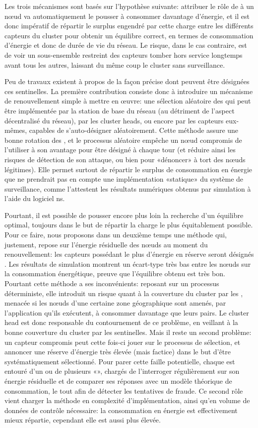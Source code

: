 Les trois mécanismes sont basés sur l'hypothèse suivante: attribuer le rôle de \cnt à un nœud va automatiquement le pousser à consommer davantage d'énergie, et il est donc impératif de répartir le surplus engendré par cette charge entre les différents capteurs du cluster pour obtenir un équilibre correct, en termes de consommation d'énergie et donc de durée de vie du réseau.
Le risque, dans le cas contraire, est de voir un sous-ensemble restreint des capteurs tomber hors service longtemps avant tous les autres, laissant du même coup le cluster sans surveillance.

Peu de travaux existent à propos de la façon précise dont peuvent être désignées ces sentinelles.
La première contribution consiste donc à introduire un mécanisme de renouvellement simple à mettre en œuvre: une sélection aléatoire des \cnst qui peut être implémentée par la station de base du réseau (au détriment de l'aspect décentralisé du réseau), par les cluster heads, ou encore par les capteurs eux-mêmes, capables de s'auto-désigner aléatoirement.
Cette méthode assure une bonne rotation des \cnst, et le processus aléatoire empêche un nœud compromis de l'utiliser à son avantage pour être désigné à chaque tour (et réduire ainsi les risques de détection de son attaque, ou bien pour «dénoncer» à tort des nœuds légitimes).
Elle permet surtout de répartir le surplus de consommation en énergie que ne prendrait pas en compte une implémentation «statique» du système de surveillance, comme l'attestent les résultats numériques obtenus par simulation à l'aide du logiciel \textsf{ns}.

Pourtant, il est possible de pousser encore plus loin la recherche d'un équilibre optimal, toujours dans le but de répartir la charge le plus équitablement possible.
Pour ce faire, nous proposons dans un deuxième temps une méthode qui, justement, repose sur l'énergie résiduelle des nœuds au moment du renouvellement: les capteurs possédant le plus d'énergie en réserve seront désignés \cnst.
Les résultats de simulation montrent un écart-type très bas entre les nœuds sur la consommation énergétique, preuve que l'équilibre obtenu est très bon.
Pourtant cette méthode a ses inconvénients: reposant sur un processus déterministe, elle introduit un risque quant à la couverture du cluster par les \cnst, menacée si les nœuds d'une certaine zone géographique sont amenés, par l'application qu'ils exécutent, à consommer davantage que leurs pairs.
Le cluster head est donc responsable du contournement de ce problème, en veillant à la bonne couverture du cluster par les sentinelles.
Mais il reste un second problème: un capteur compromis peut cette fois-ci jouer sur le processus de sélection, et annoncer une réserve d'énergie très élevée (mais factice) dans le but d'être systématiquement sélectionné.
Pour parer cette faille potentielle, chaque \cnt est entouré d'un ou de plusieurs «\vnst», chargés de l'interroger régulièrement sur son énergie résiduelle et de comparer ses réponses avec un modèle théorique de consommation, le tout afin de détecter les tentatives de fraude.
Ce second rôle vient charger la méthode en complexité d'implémentation, ainsi qu'en volume de données de contrôle nécessaire: la consommation en énergie est effectivement mieux répartie, cependant elle est aussi plus élevée.

